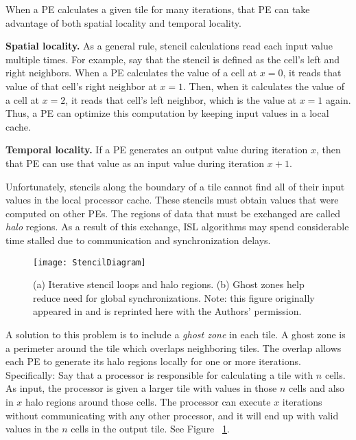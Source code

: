 \documentclass{styles/sig-alternate}
\begin{document}
When a PE calculates a given tile for many iterations, that PE can
take advantage of both spatial locality and temporal locality.
\begin{itemize*}
\item {\bf Spatial locality.} As a general rule, stencil calculations
  read each input value multiple times.  For example, say that the
  stencil is defined as the cell's left and right neighbors.  When a
  PE calculates the value of a cell at $x=0$, it reads that value of
  that cell's right neighbor at $x=1$.  Then, when it calculates the
  value of a cell at $x=2$, it reads that cell's left neighbor, which
  is the value at $x=1$ again.  Thus, a PE can optimize this
  computation by keeping input values in a local cache.
\item {\bf Temporal locality.} If a PE generates an output value
  during iteration $x$, then that PE can use that value as an input
  value during iteration $x+1$.
\end{itemize*}

Unfortunately, stencils along the boundary of a tile cannot find all
of their input values in the local processor cache.  These stencils
must obtain values that were computed on other PEs.  The regions of
data that must be exchanged are called {\em halo} regions.  As a
result of this exchange, ISL algorithms may spend considerable time
stalled due to communication and synchronization delays.

\begin{figure}
\texttt{[image: StencilDiagram]}
\caption{(a) Iterative stencil loops and halo regions.  (b) Ghost zones help
reduce need for global synchronizations.  Note: this figure originally appeared in \cite{meng}
and is reprinted here with the Authors' permission.}
\label{fig:Stencil}
\end{figure}

A solution to this problem is to include a {\em ghost zone} in each
tile.  A ghost zone is a perimeter around the tile which overlaps
neighboring tiles.  The overlap allows each PE to generate its halo
regions locally for one or more iterations.  Specifically: Say that a
processor is responsible for calculating a tile with $n$ cells.  As
input, the processor is given a larger tile with values in those $n$
cells and also in $x$ halo regions around those cells.  The processor
can execute $x$ iterations without communicating with any other
processor, and it will end up with valid values in the $n$ cells in
the output tile.  See Figure ~\ref{fig:Stencil}.
\end{document}
